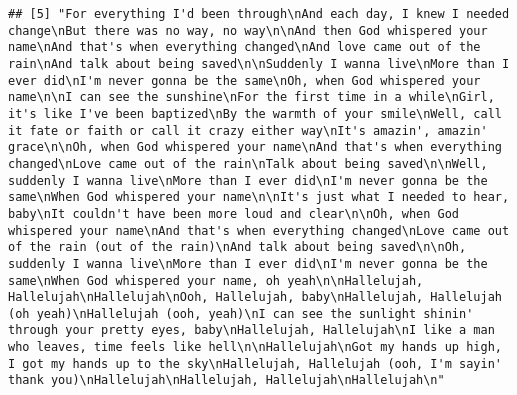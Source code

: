 \documentclass[]{article}
\begin{document}
\begin{verbatim}
## [5] "For everything I'd been through\nAnd each day, I knew I needed change\nBut there was no way, no way\n\nAnd then God whispered your name\nAnd that's when everything changed\nAnd love came out of the rain\nAnd talk about being saved\n\nSuddenly I wanna live\nMore than I ever did\nI'm never gonna be the same\nOh, when God whispered your name\n\nI can see the sunshine\nFor the first time in a while\nGirl, it's like I've been baptized\nBy the warmth of your smile\nWell, call it fate or faith or call it crazy either way\nIt's amazin', amazin' grace\n\nOh, when God whispered your name\nAnd that's when everything changed\nLove came out of the rain\nTalk about being saved\n\nWell, suddenly I wanna live\nMore than I ever did\nI'm never gonna be the same\nWhen God whispered your name\n\nIt's just what I needed to hear, baby\nIt couldn't have been more loud and clear\n\nOh, when God whispered your name\nAnd that's when everything changed\nLove came out of the rain (out of the rain)\nAnd talk about being saved\n\nOh, suddenly I wanna live\nMore than I ever did\nI'm never gonna be the same\nWhen God whispered your name, oh yeah\n\nHallelujah, Hallelujah\nHallelujah\nOoh, Hallelujah, baby\nHallelujah, Hallelujah (oh yeah)\nHallelujah (ooh, yeah)\nI can see the sunlight shinin' through your pretty eyes, baby\nHallelujah, Hallelujah\nI like a man who leaves, time feels like hell\n\nHallelujah\nGot my hands up high, I got my hands up to the sky\nHallelujah, Hallelujah (ooh, I'm sayin' thank you)\nHallelujah\nHallelujah, Hallelujah\nHallelujah\n"                                                                                                                                             

\end{verbatim}
\end{document}
